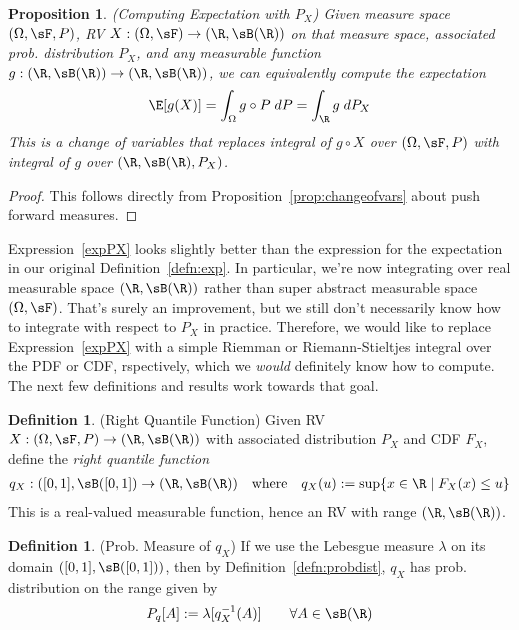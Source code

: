 \documentclass[12pt]{article}
\theoremstyle{plain}
\newtheorem{prop}[thm]{Proposition}
\theoremstyle{definition}
\newtheorem{defn}[thm]{Definition}
\theoremstyle{remark}
\newcommand{\ra}{\rightarrow}
\begin{document}
\begin{prop}\emph{(Computing Expectation with $P_X$)}
\label{prop:expPX}
Given measure space $(\Omega,\sF,P)$, RV
$X:(\Omega,\sF)\ra (\R,\sB(\R))$  on that measure space, associated
prob. distribution $P_X$, and any measurable function
$g:(\R,\sB(\R))\ra(\R,\sB(\R))$, we can equivalently compute the
expectation
\begin{align}
  \E[g(X)]
  = \int_\Omega g \circ P \;dP
  = \int_\R g \;dP_X
  \label{expPX}
\end{align}
This is a change of variables that replaces integral of $g\circ X$ over
$(\Omega,\sF,P)$ with integral of $g$ over $(\R,\sB(\R),P_X)$.
\end{prop}
\begin{proof}
This follows directly from Proposition~\ref{prop:changeofvars}
about push forward measures.
\end{proof}

Expression~\ref{expPX} looks slightly better than the expression for the
expectation in our original Definition~\ref{defn:exp}. In particular,
we're now integrating over real measurable space $(\R,\sB(\R))$ rather
than super abstract measurable space $(\Omega,\sF)$. That's surely an
improvement, but we still don't necessarily know how to integrate with
respect to $P_X$ in practice. Therefore, we would like to replace
Expression~\ref{expPX} with a simple Riemman or Riemann-Stieltjes
integral over the PDF or CDF, rspectively, which we \emph{would}
definitely know how to compute.  The next few definitions and results
work towards that goal.

\begin{defn}(Right Quantile Function)
Given RV $X:(\Omega,\sF,P)\ra(\R,\sB(\R))$
with associated distribution $P_X$ and CDF $F_X$,
define the \emph{right quantile function}
\begin{align*}
  q_X:([0,1],\sB([0,1])\ra(\R,\sB(\R))
  \quad\text{where}\quad
  q_X(u) := \sup\{x\in\R\;|\; F_X(x)\leq u\}
\end{align*}
This is a real-valued measurable function, hence an RV with range
$(\R,\sB(\R))$.
\end{defn}

\begin{defn}(Prob. Measure of $q_X$)
\label{defn:probdistq}
If we use the Lebesgue measure $\lambda$ on its domain
$([0,1],\sB([0,1]))$, then by Definition~\ref{defn:probdist},
$q_X$ has prob. distribution on the range given by
\begin{align*}
  P_q[A] := \lambda[q_X^{-1}(A)]
  \qquad \forall A\in\sB(\R)
\end{align*}
\end{defn}
\end{document}
